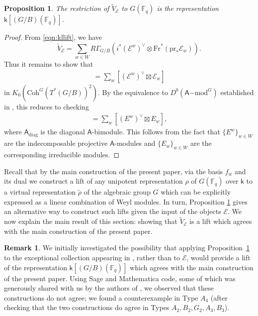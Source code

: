 \documentclass{amsart}
\newtheorem{prop}[thm]{Proposition}
\theoremstyle{definition}
\newtheorem{remark}[thm]{Remark}
\begin{document}
\begin{prop}\label{prop:exceptionallift}
    The restriction of $\tilde{V}_{\mathcal{E}}$ to $G(\mathbb{F}_q)$ is the representation $\mathsf{k}[(G/B)(\mathbb{F}_q)]$.
\end{prop}
\begin{proof}
    From \eqref{eqn:kllift}, we have
    \begin{equation}
    \tilde{V}_{\mathcal{E}} = \sum_{w \in W}R\Gamma_{G/B}(i^*(\mathcal{E}^{w})^\vee \otimes \mathrm{Fr}^*(\mathrm{pr}_*\mathcal{E}_{w})).
    \end{equation}
    Thus it remains to show that
    \begin{align}
        [\mathcal{O}_{\Delta}] = \sum_w [(\mathcal{E}^w)^\vee \boxtimes \mathcal{E}_{w}]
    \end{align}
    in $K_0(\mathrm{Coh}^G(T^*(G/B))^2)$. By the equivalence to $D^b(\mathsf A\mathrm{-mod}^G)$ established in \cite{AB, BM}, this reduces to checking
    \begin{align}
        [\mathsf A_{\mathrm{diag}}] = \sum_w [(E^w)^\vee \boxtimes E_w],
    \end{align}
    where $\mathsf A_{\mathrm{diag}}$ is the diagonal $\mathsf A$-bimodule. This follows from the fact that $\{E^w\}_{w \in W}$ are the indecomposable projective $\mathsf A$-modules and $\{E_w\}_{w \in W}$ are the corresponding irreducible modules.
\end{proof}

Recall that by the main construction of the present paper, via the basis $f_w$ and its dual we construct a lift of any unipotent representation $\rho$ of $G(\mathbb{F}_q)$ over $\mathsf{k}$ to a virtual representation $\tilde{\rho}$ of the algebraic group $G$ which can be explicitly expressed as a linear combination of Weyl modules. In turn, Proposition \ref{prop:exceptionallift} gives an alternative way to construct such lifts given the input of the objects $\mathcal{E}$. We now explain the main result of this section: showing that $\tilde{V}_{\mathcal{E}}$ is a lift which agrees with the main construction of the present paper.

\begin{remark}
We initially investigated the possibility that applying Proposition~\ref{prop:exceptionallift} to the exceptional collection appearing in \cite{SVK}, rather than to $\mathcal{E}$, would provide a lift of the representation $\mathsf{k}[(G/B)(\mathbb{F}_q)]$ which agrees with the main construction of the present paper. Using Sage and Mathematica code, some of which was generously shared with us by the authors of \cite{SVK}, we observed that these constructions do not agree; we found a counterexample in Type $A_4$ (after checking that the two constructions do agree in Types $A_2, B_2, G_2, A_3, B_3$).
\end{remark}
\end{document}
